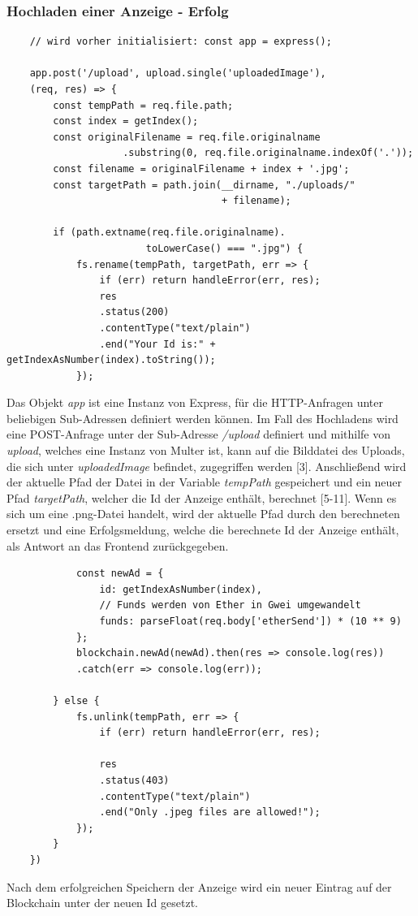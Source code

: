 \subsubsection{Hochladen einer Anzeige - Erfolg}
\begin{lstlisting}
	// wird vorher initialisiert: const app = express();
	
	app.post('/upload', upload.single('uploadedImage'), 
	(req, res) => {
		const tempPath = req.file.path;
		const index = getIndex();
		const originalFilename = req.file.originalname
					.substring(0, req.file.originalname.indexOf('.'));
		const filename = originalFilename + index + '.jpg';
		const targetPath = path.join(__dirname, "./uploads/"
									 + filename);
		
		if (path.extname(req.file.originalname).
						toLowerCase() === ".jpg") {
			fs.rename(tempPath, targetPath, err => {
				if (err) return handleError(err, res);
				res
				.status(200)
				.contentType("text/plain")
				.end("Your Id is:" + getIndexAsNumber(index).toString());
			});
\end{lstlisting}
Das Objekt \emph{app} ist eine Instanz von Express, für die HTTP-Anfragen unter beliebigen Sub-Adressen definiert werden können. Im Fall des Hochladens wird eine POST-Anfrage unter der Sub-Adresse \emph{/upload} definiert und mithilfe von \emph{upload}, welches eine Instanz von Multer ist, kann auf die Bilddatei des Uploads, die sich unter \emph{uploadedImage} befindet, zugegriffen werden [3]. Anschließend wird der aktuelle Pfad der Datei in der Variable \emph{tempPath} gespeichert und ein neuer Pfad \emph{targetPath}, welcher die Id der Anzeige enthält, berechnet [5-11]. Wenn es sich um eine .png-Datei handelt, wird der aktuelle Pfad durch den berechneten ersetzt und eine Erfolgsmeldung, welche die berechnete Id der Anzeige enthält, als Antwort an das Frontend zurückgegeben.
\begin{lstlisting}
			const newAd = {
				id: getIndexAsNumber(index),
				// Funds werden von Ether in Gwei umgewandelt
				funds: parseFloat(req.body['etherSend']) * (10 ** 9)
			};
			blockchain.newAd(newAd).then(res => console.log(res))
			.catch(err => console.log(err));
			
		} else {
			fs.unlink(tempPath, err => {
				if (err) return handleError(err, res);
				
				res
				.status(403)
				.contentType("text/plain")
				.end("Only .jpeg files are allowed!");
			});
		}
	})
\end{lstlisting}
Nach dem erfolgreichen Speichern der Anzeige wird ein neuer Eintrag auf der Blockchain unter der neuen Id gesetzt. 
